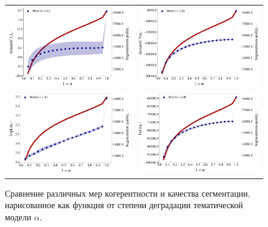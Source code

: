 \begin{figure}
\begin{tabular}{cc}
    \includegraphics[width=70mm]{images/segm_l2.png} &   \includegraphics[width=70mm]{images/segm_var.png} \\
 \includegraphics[width=70mm]{images/segm_toplen.png} &   \includegraphics[width=70mm]{images/segm_focon.png} \\
\end{tabular}
    \caption{Сравнение различных мер когерентности и качества сегментации, нарисованное как функция от степени деградации тематической модели $\alpha$. }
\label{fig:ch3_corr}
\end{figure}




